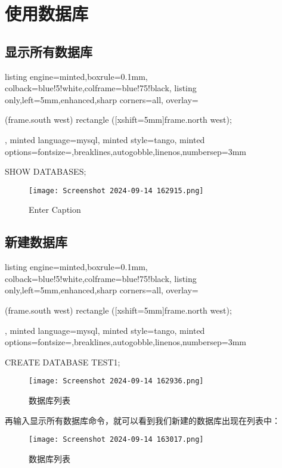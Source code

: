 \documentclass[12pt]{article}
\begin{document}
\section{使用数据库}
\subsection{显示所有数据库}
         
\begin{tcblisting}{listing engine=minted,boxrule=0.1mm,
colback=blue!5!white,colframe=blue!75!black,
listing only,left=5mm,enhanced,sharp corners=all,
overlay={\begin{tcbclipinterior} (frame.south west)
rectangle ([xshift=5mm]frame.north west);\end{tcbclipinterior}},
minted language=mysql,
minted style=tango,
minted options={fontsize=\small,breaklines,autogobble,linenos,numbersep=3mm}}
SHOW DATABASES;
\end{tcblisting}
\begin{figure}[htbp]
    \centering
    \texttt{[image: Screenshot 2024-09-14 162915.png]}
    \caption{Enter Caption}
    \label{fig:enter-label}
\end{figure}

\subsection{新建数据库}
\begin{tcblisting}{listing engine=minted,boxrule=0.1mm,
colback=blue!5!white,colframe=blue!75!black,
listing only,left=5mm,enhanced,sharp corners=all,
overlay={\begin{tcbclipinterior} (frame.south west)
rectangle ([xshift=5mm]frame.north west);\end{tcbclipinterior}},
minted language=mysql,
minted style=tango,
minted options={fontsize=\small,breaklines,autogobble,linenos,numbersep=3mm}}
CREATE DATABASE TEST1;
\end{tcblisting}
\begin{figure}[htbp]
    \centering
    \texttt{[image: Screenshot 2024-09-14 162936.png]}
    \caption{数据库列表}
    \label{fig:enter-label}
\end{figure}
{\songti 再输入显示所有数据库命令，就可以看到我们新建的数据库出现在列表中：}
\begin{figure}[htbp]
    \centering
    \texttt{[image: Screenshot 2024-09-14 163017.png]}
    \caption{数据库列表}
    \label{fig:enter-label}
\end{figure}
\end{document}

